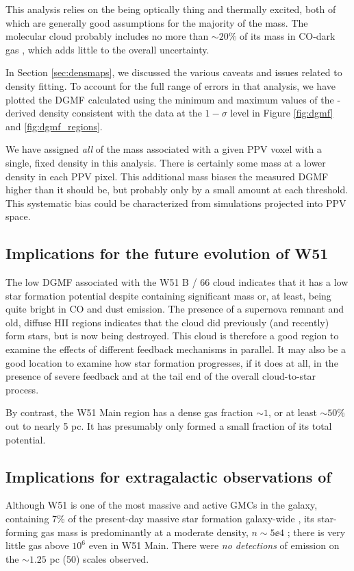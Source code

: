 This analysis relies on the \thirteenco being optically thing and thermally
excited, both of which are generally good assumptions for the majority of the
mass.  The molecular cloud probably includes no more than $\sim20\%$ of its mass
in CO-dark gas \citep{Pineda2013a,Langer2013a,Smith2014b}, which adds little to
the overall uncertainty.

In Section \ref{sec:densmaps}, we discussed the various caveats and issues
related to \formaldehyde density fitting.  To account for the full range of
errors in that analysis, we have plotted the DGMF calculated using the minimum
and maximum values of the \formaldehyde-derived density consistent with the
data at the $1-\sigma$ level in Figure \ref{fig:dgmf} and
\ref{fig:dgmf_regions}.

We have assigned \emph{all} of the mass associated with a given PPV voxel with
a single, fixed density in this analysis.  There is certainly some mass at a
lower density in each PPV pixel.  This additional mass biases the measured DGMF
higher than it should be, but probably only by a small amount at each
threshold.  This systematic bias could be characterized from simulations
projected into PPV space.

\subsection{Implications for the future evolution of W51}
The low DGMF associated with the W51 B / 66 \kms cloud indicates that it has a
low star formation potential despite containing significant mass or, at least,
being quite bright in CO and dust emission.  The presence of a supernova
remnant and old, diffuse HII regions indicates that the cloud did previously
(and recently) form stars, but is now being destroyed.  This cloud is therefore
a good region to examine the effects of different feedback mechanisms in
parallel.  It may also be a good location to examine how star formation
progresses, if it does at all, in the presence of severe feedback and at the
tail end of the overall cloud-to-star process.

By contrast, the W51 Main region has a dense gas fraction $\sim1$, or at least
$\sim50\%$ out to nearly 5 pc.  It has presumably only formed a small fraction
of its total potential.

\subsection{Implications for extragalactic observations of \formaldehyde}
Although W51 is one of the most massive and active GMCs in the galaxy,
containing 7\% of the present-day massive star formation galaxy-wide
\citep{Urquhart2014a}, its star-forming gas mass is predominantly at a moderate
density, $n\sim5\ee{4}$ \percc; there is very little gas above $10^6$ \percc even
in W51 Main.  There were \emph{no detections} of \formaldehyde emission on the
$\sim1.25$ pc (50\arcsec) scales observed.

